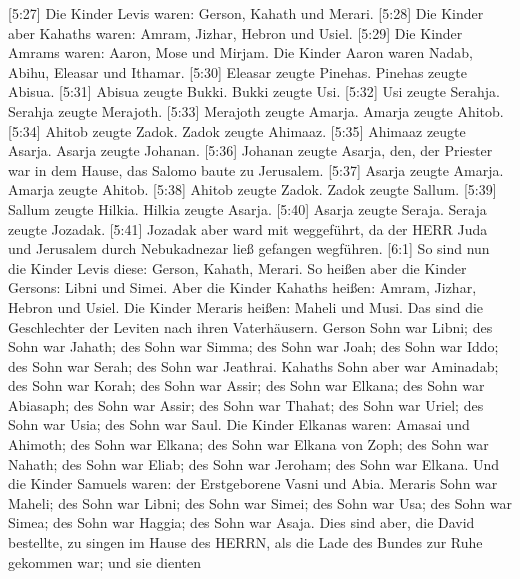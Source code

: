  {[}5:27{]} Die Kinder Levis waren: Gerson, Kahath und
Merari.  {[}5:28{]} Die Kinder aber Kahaths waren: Amram,
Jizhar, Hebron und Usiel.  {[}5:29{]} Die Kinder Amrams
waren: Aaron, Mose und Mirjam. Die Kinder Aaron waren Nadab, Abihu,
Eleasar und Ithamar.  {[}5:30{]} Eleasar zeugte Pinehas.
Pinehas zeugte Abisua.  {[}5:31{]} Abisua zeugte Bukki.
Bukki zeugte Usi.  {[}5:32{]} Usi zeugte Serahja. Serahja
zeugte Merajoth.  {[}5:33{]} Merajoth zeugte Amarja. Amarja
zeugte Ahitob.  {[}5:34{]} Ahitob zeugte Zadok. Zadok zeugte
Ahimaaz.  {[}5:35{]} Ahimaaz zeugte Asarja. Asarja zeugte
Johanan.  {[}5:36{]} Johanan zeugte Asarja, den, der
Priester war in dem Hause, das Salomo baute zu Jerusalem. 
{[}5:37{]} Asarja zeugte Amarja. Amarja zeugte Ahitob. 
{[}5:38{]} Ahitob zeugte Zadok. Zadok zeugte Sallum. 
{[}5:39{]} Sallum zeugte Hilkia. Hilkia zeugte Asarja. 
{[}5:40{]} Asarja zeugte Seraja. Seraja zeugte Jozadak. 
{[}5:41{]} Jozadak aber ward mit weggeführt, da der HERR Juda und
Jerusalem durch Nebukadnezar ließ gefangen wegführen. 
{[}6:1{]} So sind nun die Kinder Levis diese: Gerson, Kahath, Merari.
 So heißen aber die Kinder Gersons: Libni und Simei.
 Aber die Kinder Kahaths heißen: Amram, Jizhar, Hebron und
Usiel.  Die Kinder Meraris heißen: Maheli und Musi. Das
sind die Geschlechter der Leviten nach ihren Vaterhäusern. 
Gerson Sohn war Libni; des Sohn war Jahath; des Sohn war Simma;
 des Sohn war Joah; des Sohn war Iddo; des Sohn war Serah;
des Sohn war Jeathrai.  Kahaths Sohn aber war Aminadab; des
Sohn war Korah; des Sohn war Assir;  des Sohn war Elkana;
des Sohn war Abiasaph; des Sohn war Assir;  des Sohn war
Thahat; des Sohn war Uriel; des Sohn war Usia; des Sohn war Saul.
 Die Kinder Elkanas waren: Amasai und Ahimoth;
 des Sohn war Elkana; des Sohn war Elkana von Zoph; des
Sohn war Nahath;  des Sohn war Eliab; des Sohn war Jeroham;
des Sohn war Elkana.  Und die Kinder Samuels waren: der
Erstgeborene Vasni und Abia.  Meraris Sohn war Maheli; des
Sohn war Libni; des Sohn war Simei; des Sohn war Usa;  des
Sohn war Simea; des Sohn war Haggia; des Sohn war Asaja. 
Dies sind aber, die David bestellte, zu singen im Hause des HERRN, als
die Lade des Bundes zur Ruhe gekommen war;  und sie dienten
